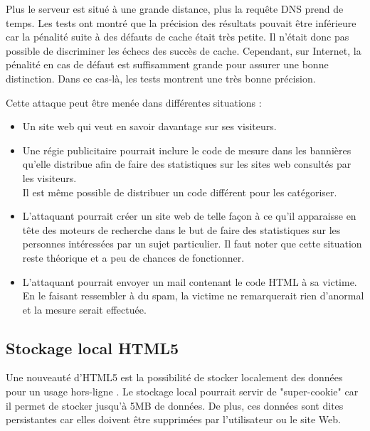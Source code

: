 Plus le serveur est situé à une grande distance, plus la requête DNS prend de temps. Les tests ont montré que la précision des résultats pouvait être inférieure car la pénalité suite à des défauts de cache était très petite. Il n'était donc pas possible de discriminer les échecs des succès de cache. Cependant, sur Internet, la pénalité en cas de défaut est suffisamment grande pour assurer une bonne distinction. Dans ce cas-là, les tests montrent une très bonne précision.
\newline


Cette attaque peut être menée dans différentes situations :
\begin{itemize}
  \item Un site web qui veut en savoir davantage sur ses visiteurs.
  \item Une régie publicitaire pourrait inclure le code de mesure dans les bannières qu'elle distribue afin de faire des statistiques sur les sites web consultés par les visiteurs.\\Il est même possible de distribuer un code différent pour les catégoriser.
  \item L'attaquant pourrait créer un site web de telle façon à ce qu'il apparaisse en tête des moteurs de recherche dans le but de faire des statistiques sur les personnes intéressées par un sujet particulier. Il faut noter que cette situation reste théorique et a peu de chances de fonctionner.
  \item L'attaquant pourrait envoyer un mail contenant le code HTML à sa victime.\\En le faisant ressembler à du spam, la victime ne remarquerait rien d'anormal et la mesure serait effectuée.
\end{itemize}


\subsection{Stockage local HTML5}
\label{cache_html5}
Une nouveauté d'HTML5 est la possibilité de stocker localement des données pour un usage hors-ligne \cite{West:2012:APS:2038772.2038791}.
Le stockage local pourrait servir de "super-cookie" car il permet de stocker jusqu'à 5MB de données. De plus, ces données sont dites persistantes car elles doivent être supprimées par l'utilisateur ou le site Web.
\newline

